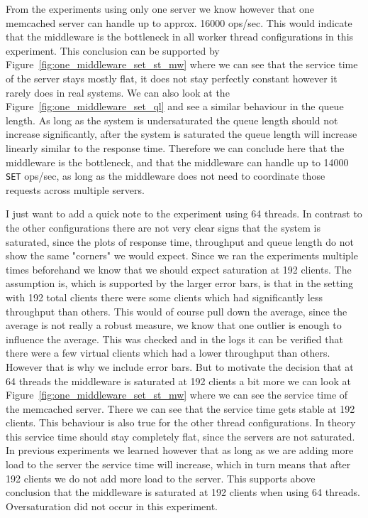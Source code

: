\documentclass[11pt,a4paper]{article}
\begin{document}
%
From the experiments using only one server we know however that one memcached server can handle up to approx. 16000 ops/sec.
%
This would indicate that the middleware is the bottleneck in all worker thread configurations in this experiment.
%
This conclusion can be supported by Figure~\ref{fig:one_middleware_set_st_mw} where we can see that the service time of the server stays mostly flat, it does not stay perfectly constant however it rarely does in real systems.
%
We can also look at the Figure~\ref{fig:one_middleware_set_ql} and see a similar behaviour in the queue length.
%
As long as the system is undersaturated the queue length should not increase significantly, after the system is saturated the queue length will increase linearly similar to the response time.
%
Therefore we can conclude here that the middleware is the bottleneck, and that the middleware can handle up to 14000 \texttt{SET} ops/sec, as long as the middleware does not need to coordinate those requests across multiple servers.
%
\par
%
I just want to add a quick note to the experiment using 64 threads.
%
In contrast to the other configurations there are not very clear signs that the system is saturated, since the plots of response time, throughput and queue length do not show the same "corners" we would expect.
%
Since we ran the experiments multiple times beforehand we know that we should expect saturation at 192 clients.
%
The assumption is, which is supported by the larger error bars, is that in the setting with 192 total clients there were some clients which had significantly less throughput than others. 
%
This would of course pull down the average, since the average is not really a robust measure, we know that one outlier is enough to influence the average.
%
This was checked and in the logs it can be verified that there were a few virtual clients which had a lower throughput than others.
%
However that is why we include error bars.
%
But to motivate the decision that at 64 threads the middleware is saturated at 192 clients a bit more we can look at Figure~\ref{fig:one_middleware_set_st_mw} where we can see the service time of the memcached server.
%
There we can see that the service time gets stable at 192 clients.
%
This behaviour is also true for the other thread configurations.
%
In theory this service time should stay completely flat, since the servers are not saturated.
%
In previous experiments we learned however that as long as we are adding more load to the server the service time will increase, which in turn means that after 192 clients we do not add more load to the server.
%
This supports above conclusion that the middleware is saturated at 192 clients when using 64 threads.
%
Oversaturation did not occur in this experiment.
%
\end{document}
